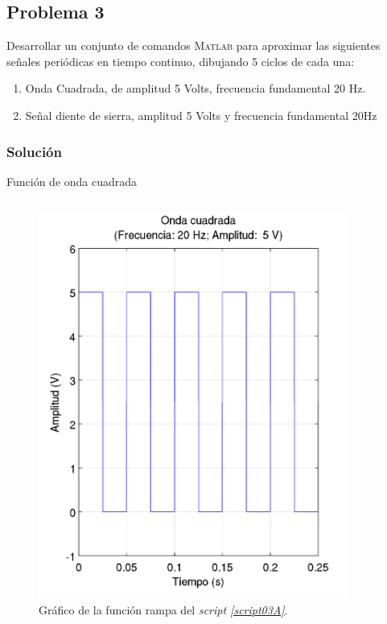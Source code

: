 \documentclass[a4paper,12pt,final]{article}
\begin{document}
  \newpage
  \subsection*{Problema 3}
    \noindent Desarrollar un conjunto de comandos \textsc{Matlab} para
    aproximar las siguientes señales periódicas en tiempo continuo, dibujando
    5 ciclos de cada una:
    \begin{enumerate}
        \item Onda Cuadrada, de amplitud 5 Volts, frecuencia fundamental 20 Hz.
        \item Señal diente de sierra, amplitud 5 Volts y frecuencia fundamental 20Hz
    \end{enumerate}

    \subsubsection*{Solución}
      \begin{listing}[H]
        \caption{Función de onda cuadrada}
        \label{script03A}
        \inputminted{matlab}{./laboratorio_2/squarew.m}
      \end{listing}

      \begin{figure}[H]
        \caption{Gráfico de la función rampa del \emph{script \ref{script03A}}.}
        \label{script03Afigure}
        \includegraphics[height=5in]{./laboratorio_2/problema03_a.png}
      \end{figure}
      \vspace{\fill}
\end{document}
